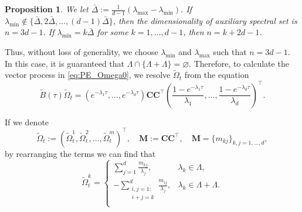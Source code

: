 \documentclass[pdftex,11pt,a4paper] {article}
\newtheorem{proposition}{Proposition}[section]
\begin{document}
\begin{proposition}
We let $\bar\Delta:=\frac{1}{d-1}\left(\lambda_{\max}-\lambda_{\min}\right)$.
If $\lambda_{\min}\not\in\{\bar\Delta,2\bar\Delta,\ldots, (d-1)\bar\Delta\}$, then the dimensionality of auxiliary spectral set is $n=3d-1$. 
If $\lambda_{\min}=k\bar\Delta$ for some $k=1,\ldots, d-1$, then $n=k+2d-1$.
\end{proposition}
Thus, without loss of generality, we choose $\lambda_{\min}$ and $\lambda_{\max}$ such that $n=3d-1$. 
In this case, it is guaranteed that $\Lambda\cap\{\Lambda+\Lambda\}=\varnothing$. 
Therefore, to calculate the vector process in \eqref{eq:PE_Omega0}, we resolve $\tilde\Omega_t$ from the equation
\begin{equation*}
\tilde B(\tau)\tilde\Omega_t=\left(e^{-\lambda_1\tau}, \ldots, e^{-\lambda_d\tau}\right)\mathbf{C}\mathbf{C}^\top
\left(\frac{1-e^{-\lambda_1\tau}}{\lambda_1}, \ldots, \frac{1-e^{-\lambda_d\tau}}{\lambda_d}\right)^\top.
\end{equation*}

If we denote
\begin{equation*}
\tilde\Omega_t:=\left(\tilde\Omega_t^1,\tilde\Omega_t^2,\ldots, \tilde\Omega_t^m\right)^\top,\quad 
\mathbf{M}:=\mathbf{C}\mathbf{C}^\top, \quad \mathbf{M}=\{m_{kj}\}_{k,j=1,\ldots,d}, 
\end{equation*}
by rearranging the terms we can find that 
\begin{equation}\label{eq:PE_Omega}
\tilde\Omega_t^k=
\begin{cases}
\sum_{j=1}^d\frac{m_{kj}}{\lambda_j}, & \lambda_k\in\Lambda,\\
-\sum_{\substack{i,j=1:\\i+j=k}}^d\frac{m_{ij}}{\lambda_j}, & \lambda_k\in\Lambda+\Lambda.\\
\end{cases}
\end{equation}
\end{document}
